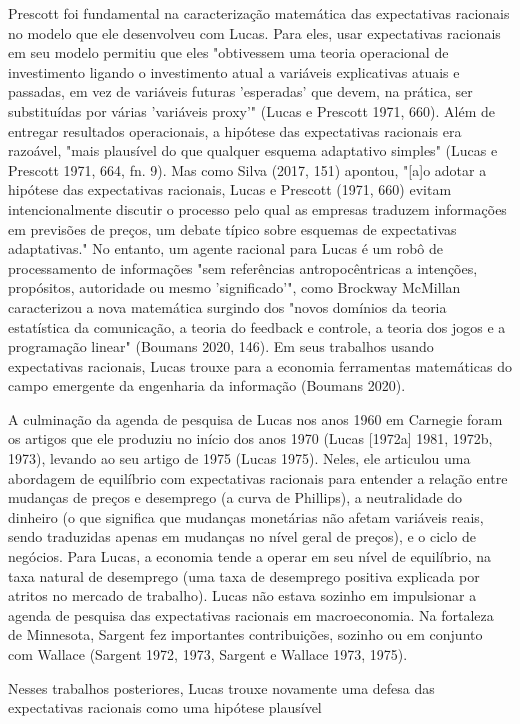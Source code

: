 \documentclass[12pt]{article}
\begin{document}
Prescott foi fundamental na caracterização matemática das expectativas racionais no modelo que ele desenvolveu com Lucas. Para eles, usar expectativas racionais em seu modelo permitiu que eles "obtivessem uma teoria operacional de investimento ligando o investimento atual a variáveis explicativas atuais e passadas, em vez de variáveis futuras 'esperadas' que devem, na prática, ser substituídas por várias 'variáveis proxy'" (Lucas e Prescott 1971, 660). Além de entregar resultados operacionais, a hipótese das expectativas racionais era razoável, "mais plausível do que qualquer esquema adaptativo simples" (Lucas e Prescott 1971, 664, fn. 9). Mas como Silva (2017, 151) apontou, "[a]o adotar a hipótese das expectativas racionais, Lucas e Prescott (1971, 660) evitam intencionalmente discutir o processo pelo qual as empresas traduzem informações em previsões de preços, um debate típico sobre esquemas de expectativas adaptativas." No entanto, um agente racional para Lucas é um robô de processamento de informações "sem referências antropocêntricas a intenções, propósitos, autoridade ou mesmo 'significado'", como Brockway McMillan caracterizou a nova matemática surgindo dos "novos domínios da teoria estatística da comunicação, a teoria do feedback e controle, a teoria dos jogos e a programação linear" (Boumans 2020, 146). Em seus trabalhos usando expectativas racionais, Lucas trouxe para a economia ferramentas matemáticas do campo emergente da engenharia da informação (Boumans 2020).

A culminação da agenda de pesquisa de Lucas nos anos 1960 em Carnegie foram os artigos que ele produziu no início dos anos 1970 (Lucas [1972a] 1981, 1972b, 1973), levando ao seu artigo de 1975 (Lucas 1975). Neles, ele articulou uma abordagem de equilíbrio com expectativas racionais para entender a relação entre mudanças de preços e desemprego (a curva de Phillips), a neutralidade do dinheiro (o que significa que mudanças monetárias não afetam variáveis reais, sendo traduzidas apenas em mudanças no nível geral de preços), e o ciclo de negócios. Para Lucas, a economia tende a operar em seu nível de equilíbrio, na taxa natural de desemprego (uma taxa de desemprego positiva explicada por atritos no mercado de trabalho). Lucas não estava sozinho em impulsionar a agenda de pesquisa das expectativas racionais em macroeconomia. Na fortaleza de Minnesota, Sargent fez importantes contribuições, sozinho ou em conjunto com Wallace (Sargent 1972, 1973, Sargent e Wallace 1973, 1975).

Nesses trabalhos posteriores, Lucas trouxe novamente uma defesa das expectativas racionais como uma hipótese plausível
\end{document}
